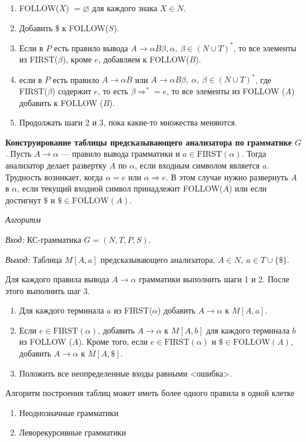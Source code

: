 \begin{enumerate}
    \item FOLLOW($X$) $= \varnothing$ для каждого знака $X \in N$.
    \item Добавить \$ к FOLLOW($S$).
    \item Если в $P$ есть правило вывода $A \rightarrow \alpha B \beta, \alpha,~\beta \in (N \cup T)^\ast$, то все элементы из FIRST($\beta$), кроме $e$, добавляем к FOLLOW($B$).
    \item если в $P$ есть правило $A \rightarrow \alpha B$ или $A \rightarrow \alpha B \beta,~\alpha,~\beta \in (N \cup T)^\ast$, где FIRST($\beta$) содержит $e$, то есть $\beta \Rightarrow^\ast = e$, то все элементы из FOLLOW ($A$) добавить к FOLLOW ($B$).
    \item Продолжать шаги 2 и 3, пока какие-то множества меняются.
\end{enumerate}

\textbf{Конструирование таблицы предсказывающего анализатора по грамматике $G$}.
Пусть $A \rightarrow \alpha$ --- правило вывода грамматики и $a \in \text{FIRST}(\alpha)$. 
Тогда анализатор делает развертку $A$ по $\alpha$, если входным символом является $a$. 
Трудность возникает, когда $\alpha = e$ или $\alpha \Rightarrow e$. 
В этом случае нужно развернуть $A$ в $\alpha$, если текущий входной символ принадлежит FOLLOW($A$) или если достигнут \$ и $\$ \in \text{FOLLOW}(A)$.

\textit{Алгоритм}

\textit{Вход:} КС-грамматика $G = (N, T, P, S)$.

\textit{Выход:} Таблица $M[A, a]$ предсказывающего анализатора, $A \in N,~a \in T \cup \{\$\}$.

Для каждого правила вывода $A \rightarrow \alpha$ грамматики выполнить шаги 1 и 2. После этого выполнить шаг 3.
\begin{enumerate}
    \item Для каждого терминала $a$ из FIRST($\alpha$) добавить $A \rightarrow \alpha$ к $M[A, a]$.
    \item Если $e \in \text{FIRST}(\alpha)$, добавить $A \rightarrow \alpha$ к $M[A, b]$ для каждого терминала $b$ из FOLLOW ($A$).
    Кроме того, если $e \in \text{FIRST}(\alpha)$ и $\$ \in \text{FOLLOW}(A)$, добавить $A \rightarrow \alpha$ к $M[A, \$]$.
    \item Положить все неопределенные входы равными <ошибка>. 
\end{enumerate}

Алгоритм построения таблиц может иметь более одного правила в одной клетке
\begin{enumerate}
\item Неоднозначные грамматики
\item Леворекурсивные грамматики
\end{enumerate}


